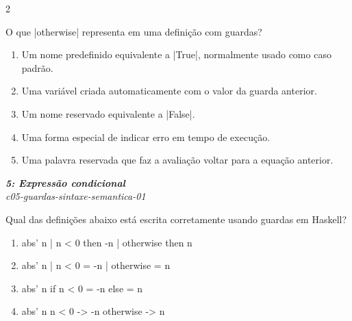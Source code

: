 \documentclass[a4paper,10pt,brazil]{article}
\begin{document}
\begin{multicols}{2}
\begin{flushright}
\end{flushright}
O que \haskellinline|otherwise| representa em uma definição com guardas?

\begin{enumerate}
  \item Um nome predefinido equivalente a \haskellinline|True|, normalmente usado como caso padrão.

  \item Uma variável criada automaticamente com o valor da guarda anterior.

  \item Um nome reservado equivalente a \haskellinline|False|.

  \item Uma forma especial de indicar erro em tempo de execução.

  \item Uma palavra reservada que faz a avaliação voltar para a equação anterior.


\end{enumerate}

\begin{flushright}
  \footnotesize
  \textit{\textbf{5: Expressão condicional}}\\
  \textit{c05-guardas-sintaxe-semantica-01}\\

\end{flushright}
Qual das definições abaixo está escrita corretamente usando guardas em Haskell?

\begin{enumerate}
  \item \begin{haskellcode}
abs' n
  | n < 0 then -n
  | otherwise then n
\end{haskellcode}

  \item \begin{haskellcode}
abs' n
  | n < 0     = -n
  | otherwise = n
\end{haskellcode}

  \item \begin{haskellcode}
abs' n
  if n < 0 = -n
  else     = n
\end{haskellcode}

  \item \begin{haskellcode}
abs' n
  n < 0 -> -n
  otherwise -> n
\end{haskellcode}


\end{enumerate}
\end{multicols}
\end{document}
